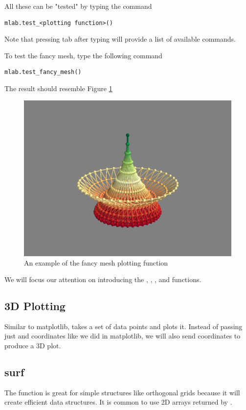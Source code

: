 All these can be "tested" by typing the command
\begin{lstlisting}
mlab.test_<plotting function>()
\end{lstlisting}
Note that pressing tab after typing  will provide a 
list of available commands. 

To test the fancy mesh, type the following command
\begin{lstlisting}
mlab.test_fancy_mesh()
\end{lstlisting}

The result should resemble Figure \ref{fig:fancymesh}

\begin{figure} 
\includegraphics[width=\textwidth]{fancymesh.png}
\caption{An example of the fancy mesh plotting function} 
\label{fig:fancymesh}
\end{figure}


We will focus our attention on introducing the , , 
, and  functions. 


\subsection*{3D Plotting} Similar to matplotlib,  takes a set
of data points and plots it. Instead of passing just  and 
coordinates like we did in matplotlib, we will also send 
coordinates to produce a 3D plot. 

\subsection*{surf}
The  function is great for simple structures like orthogonal grids 
because it will create efficient data structures. 
It is common to use 2D arrays returned by . 

